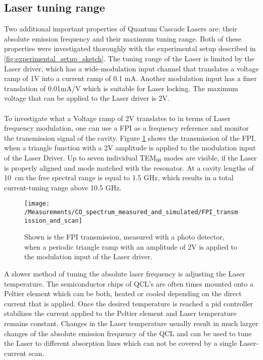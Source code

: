 \subsection{Laser tuning range}
Two additional important properties of Quantum Cascade Lasers are: their absolute emission frequency and their maximum tuning range. Both of these properties were investigated thoroughly with the experimental setup described in \ref{fig:experimental_setup_sketch}. The tuning range of the Laser is limited by the Laser driver, which has a wide-modulation input channel that translates a voltage ramp of 1V into a current ramp of 0.1 mA. Another modulation input has a finer translation of 0.01mA/V which is suitable for Laser locking. The maximum voltage that can be applied to the Laser driver is 2V.\\\\
\noindent
To investigate what a Voltage ramp of 2V translates to in terms of Laser frequency modulation, one can use a FPI as a frequency reference and monitor the transmission signal of the cavity. Figure \ref{fig:FPI_2V_scan} shows the transmission of the FPI, when a triangle function with a 2V amplitude is applied to the modulation input of the Laser Driver. Up to seven individual TEM$_{00}$ modes are visible, if the Laser is properly aligned and mode matched with the resonator. At a cavity lengths of \mbox{10 cm} the free spectral range is equal to 1.5 GHz, which results in a total current-tuning range above 10.5 GHz.
\begin{figure}[H]
	\centering
	\texttt{[image: /Measurements/CO\_spectrum\_measured\_and\_simulated/FPI\_transmission\_and\_scan]}
	\caption{Shown is the FPI transmission, measured with a photo detector, when a periodic triangle ramp with an amplitude of 2V is applied to the modulation input of the Laser driver.}
	\label{fig:FPI_2V_scan}
\end{figure}
\noindent
A slower method of tuning the absolute laser frequency is adjusting the Laser temperature. The semiconductor chips of QCL's are often times mounted onto a Peltier element which can be both, heated or cooled depending on the direct current that is applied. Once the desired temperature is reached a pid controller stabilizes the current applied to the Peltier element and Laser temperature remains constant. Changes in the Laser temperature usually result in much larger changes of the absolute emission frequency of the QCL and can be used to tune the Laser to different absorption lines which can not be covered by a single Laser-current scan.\\\\
